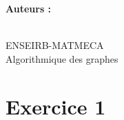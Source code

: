 \documentclass[a4paper,12pt]{article}
\title{\texteTitre}
\author{\texteAuteurs}
\date{\texteDate}
\begin{document}


\hypersetup{pageanchor=false}
\begin{titlepage}
    \centering

    \vspace*{1.5cm}

    {\Huge\bfseries \texteNumero\par}

    \vspace{0.8cm}

    {\LARGE \texteTitre \par}

    \vspace{7cm}

    {\Large
    \textbf{Auteurs :}\\
    \texteAuteurs\par}

    \vfill

    {\large
    \texteDate\\
    ENSEIRB-MATMECA\\
    Algorithmique des graphes
    \par}

    \vspace{1cm}

\end{titlepage}
\hypersetup{pageanchor=true} %


\section{Exercice 1}

\end{document}
